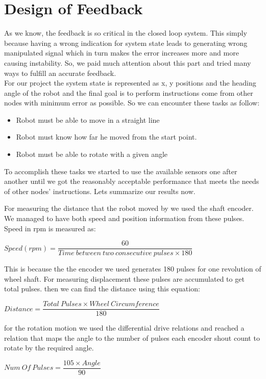 \documentclass[12pt]{book}
\begin{document}
	\section{Design of Feedback}
	As we know, the feedback is so critical in the closed loop system. This simply because having a wrong indication for system state leads to generating wrong manipulated signal which in turn makes the error increases more and more causing instability. So, we paid much attention about this part and tried many ways to fulfill an accurate feedback. \\
	For our project the system state is represented as x, y positions and the heading angle of the robot and the final goal is to perform instructions come from other nodes with minimum error as possible. So we can encounter these tasks as follow:
	\begin{itemize}
		\item Robot must be able to move in a straight line
		\item Robot must know how far he moved from the start point.
		\item Robot must be able to rotate with a given angle
	\end{itemize}

	\noindent To accomplish these tasks we started to use the available sensors one after another until we got the reasonably acceptable performance that meets the needs of other nodes' instructions. Lets summarize our results now.
	
	\noindent For measuring the distance that the robot moved by we used the shaft encoder. We managed to have both speed and position information from these pulses. Speed in rpm is measured as:
	\begin{center}
		$ Speed (rpm) = \dfrac{60}{Time\ between\ two\ consecutive\ pulses \times 180} $
	\end{center}
	\noindent This is because the the encoder we used generates 180 pulses for one revolution of wheel shaft. For measuring displacement these pulses are accumulated to get total pulses. then we can find the distance using this equation:
	\begin{center}
		$ Distance = \dfrac{Total\ Pulses  \times Wheel\ Circumference}{180} $
	\end{center}
	
	\noindent for the rotation motion we used the differential drive relations and reached a relation that maps the angle to the number of pulses each encoder shout count to rotate by the required angle.
	\begin{center}
		$ Num\ Of\ Pulses = \dfrac{105 \times Angle}{90} $
	\end{center}
	
\end{document}
